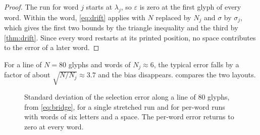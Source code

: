 \begin{proof}
The run for word $j$ starts at $\lambda_j$, so $\varepsilon$ is zero at the
first glyph of every word. Within the word, \cref{eq:drift} applies with $N$
replaced by $N_j$ and $\sigma$ by $\sigma_j$, which gives the first two bounds
by the triangle inequality and the third by \cref{thm:drift}. Since every word
restarts at its printed position, no space contributes to the error of a later
word.
\end{proof}

For a line of $N = 80$ glyphs and words of $N_j \approx 6$, the typical error
falls by a factor of about $\sqrt{N/N_j} \approx 3.7$ and the bias disappears.
 compares the two layouts.

\begin{figure}[t]
\centering
{}
\caption{Standard deviation of the selection error along a line of $80$ glyphs,
from \cref{eq:bridge}, for a single stretched run and for per-word runs with
words of six letters and a space. The per-word error returns to zero at every
word.}
\label{fig:drift}
\end{figure}
